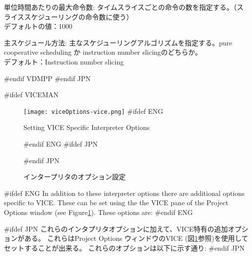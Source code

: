 \documentclass[\pformat,12pt]{article}
\newcommand{\guicmd}[1]{{\sf #1}}
\newcommand{\guicmd}[1]{{\gt #1}}
\begin{document}
\begin{list}{}{}
\item[\guicmd{単位時間あたりの最大命令数}:]
  タイムスライスごとの命令の数を指定する。（スライススケジューリングの命令数に使う） \\
  デフォルトの値：1000\\
  
\item[\guicmd{主スケジュール方法}:]
  主なスケジューリングアルゴリズムを指定する。pure cooperative scheduling か 
  instruction number slicingのどちらか。 \\
  デフォルト：Instruction number slicing

#endif VDMPP
#endif JPN
\end{list}

#ifdef VICEMAN
\begin{figure}[tbh]
\begin{center}
\texttt{[image: viceOptions-vice.png]}
#ifdef ENG
\caption{Setting VICE Specific Interpreter Options}
#endif ENG
#ifdef JPN
\caption{インタープリタのオプション設定}
#endif JPN
\label{fig:optintvice}
\end{center}
\end{figure}

#ifdef ENG
In addition to these interpreter options there are additional options
specific to VICE. These can be set using the the 
\guicmd{VICE} pane of the \guicmd{Project Options} window (see
Figure\ref{fig:optintvice}). These options are:
#endif ENG

#ifdef JPN
これらのインタプリタオプションに加えて、VICE特有の追加オプションがある。
これらは\guicmd{Project Options} ウィンドウの\guicmd{VICE} 
(図\ref{fig:optintvice}参照)を使用してセットすることが出来る。
これらのオプションは以下に示す通り:
#endif JPN
\end{document}
